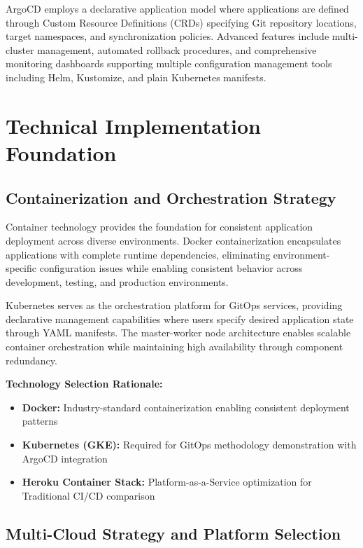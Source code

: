 ArgoCD employs a declarative application model where applications are defined through Custom Resource Definitions (CRDs) specifying Git repository locations, target namespaces, and synchronization policies. Advanced features include multi-cluster management, automated rollback procedures, and comprehensive monitoring dashboards supporting multiple configuration management tools including Helm, Kustomize, and plain Kubernetes manifests.

\section{Technical Implementation Foundation}

\subsection{Containerization and Orchestration Strategy}

Container technology provides the foundation for consistent application deployment across diverse environments. Docker containerization encapsulates applications with complete runtime dependencies, eliminating environment-specific configuration issues while enabling consistent behavior across development, testing, and production environments.

Kubernetes serves as the orchestration platform for GitOps services, providing declarative management capabilities where users specify desired application state through YAML manifests. The master-worker node architecture enables scalable container orchestration while maintaining high availability through component redundancy.

\textbf{Technology Selection Rationale:}
\begin{itemize}
\item \textbf{Docker:} Industry-standard containerization enabling consistent deployment patterns
\item \textbf{Kubernetes (GKE):} Required for GitOps methodology demonstration with ArgoCD integration
\item \textbf{Heroku Container Stack:} Platform-as-a-Service optimization for Traditional CI/CD comparison
\end{itemize}

\subsection{Multi-Cloud Strategy and Platform Selection}

